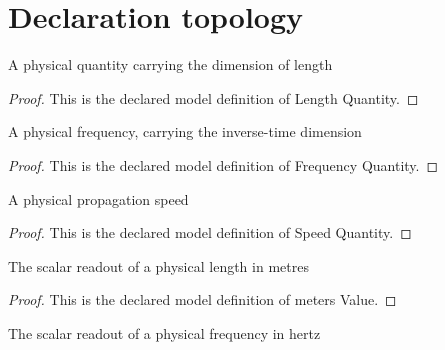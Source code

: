 \section{Declaration topology}
\begin{definition}
  \label{def:physics:phyx-mini-0117:phyxminiproblems-problemphyxmini0117-lengthquantity}
  A physical quantity carrying the dimension of length
\end{definition}
\begin{proof}
  This is the declared model definition of Length Quantity.
\end{proof}
\begin{definition}
  \label{def:physics:phyx-mini-0117:phyxminiproblems-problemphyxmini0117-frequencyquantity}
  A physical frequency, carrying the inverse-time dimension
\end{definition}
\begin{proof}
  This is the declared model definition of Frequency Quantity.
\end{proof}
\begin{definition}
  \label{def:physics:phyx-mini-0117:phyxminiproblems-problemphyxmini0117-speedquantity}
  A physical propagation speed
\end{definition}
\begin{proof}
  This is the declared model definition of Speed Quantity.
\end{proof}
\begin{definition}
  \label{def:physics:phyx-mini-0117:phyxminiproblems-problemphyxmini0117-metersvalue}
  The scalar readout of a physical length in metres
\end{definition}
\begin{proof}
  This is the declared model definition of meters Value.
\end{proof}
\begin{definition}
  \label{def:physics:phyx-mini-0117:phyxminiproblems-problemphyxmini0117-hertzvalue}
  The scalar readout of a physical frequency in hertz
\end{definition}
